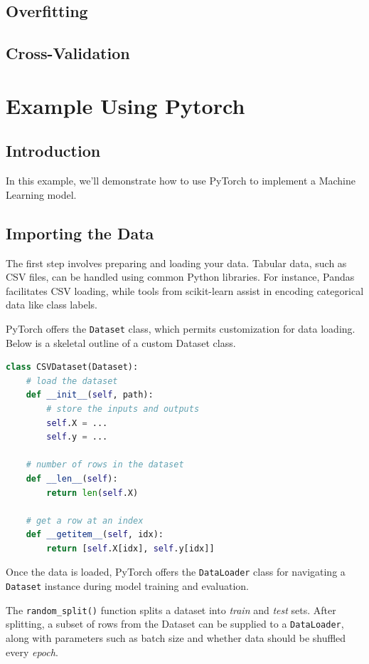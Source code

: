 \documentclass{tufte-handout}
\begin{document}
  \subsection{Overfitting}%
  \label{sub:Overfitting}
\subsection{Cross-Validation}%
  \label{sub:Cross-Validation}
  
 \section{Example Using Pytorch} 
 \subsection{Introduction}%
  \label{sub:Introduction}
  
In this example, we'll demonstrate how to use PyTorch to implement a Machine Learning model.\cite{brownlee_2023}

\subsection{Importing the Data}
The first step involves preparing and loading your data. Tabular data, such as CSV files, can be handled using common Python libraries. For instance, Pandas facilitates CSV loading, while tools from scikit-learn assist in encoding categorical data like class labels.

PyTorch offers the \texttt{Dataset} class, which permits customization for data loading. Below is a skeletal outline of a custom Dataset class.

\begin{lstlisting}[language=Python, caption=Python code for a PyTorch Dataset class]
class CSVDataset(Dataset):
    # load the dataset
    def __init__(self, path):
        # store the inputs and outputs
        self.X = ...
        self.y = ...
 
    # number of rows in the dataset
    def __len__(self):
        return len(self.X)
 
    # get a row at an index
    def __getitem__(self, idx):
        return [self.X[idx], self.y[idx]]
\end{lstlisting}
Once the data is loaded, PyTorch offers the \texttt{DataLoader} class for navigating a \texttt{Dataset} instance during model training and evaluation. 

The \texttt{random\_split()} function splits a dataset into \textit{train} and \textit{test} sets. After splitting, a subset of rows from the Dataset can be supplied to a \texttt{DataLoader}, along with parameters such as batch size and whether data should be shuffled every \textit{epoch}.
\end{document}
